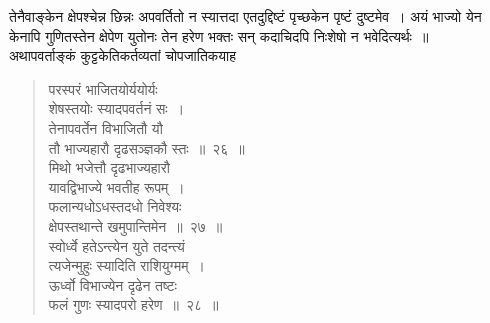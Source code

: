 \documentclass[11pt, openany]{book}
\begin{document}
\newpage%

\noindent तेनैवाङ्केन क्षेपश्चेन्न छिन्नः अपवर्तितो न स्यात्तदा एतदुद्दिष्टं
पृच्छकेन पृष्टं दुष्टमेव~। अयं भाज्यो येन केनापि गुणितस्तेन क्षेपेण युतोनः तेन हरेण
भक्तः सन् कदाचिदपि निःशेषो न भवेदित्यर्थः~॥ \\

\vspace{-3mm}
 अथापवर्ताङ्कं कुट्टकेतिकर्तव्यतां चोपजातिकयाह\textendash 

 \label{26}
\begin{quote}
    \bs
     परस्परं भाजितयोर्ययोर्यः \\

\vspace{-7mm}
\hspace{1cm} शेषस्तयोः स्यादपवर्तनं सः~। \\

\vspace{-7mm}
 तेनापवर्तेन विभाजितौ यौ \\

\vspace{-7mm}
\hspace{1cm} तौ भाज्यहारौ दृढसञ्ज्ञकौ स्तः~॥~२६~॥ \\

 \vspace{-4mm}
 \label{27}
 मिथो भजेत्तौ दृढभाज्यहारौ \\

\vspace{-7mm}
\hspace{1cm} यावद्विभाज्ये भवतीह रूपम्~। \\

\vspace{-7mm}
 फलान्यधोऽधस्तदधो निवेश्यः \\

\vspace{-7mm}
\hspace{1cm} क्षेपस्तथान्ते खमुपान्तिमेन~॥~२७~॥ \\

 \vspace{-4mm}
 \label{28}
 स्वोर्ध्वे हतेऽन्त्येन युते तदन्त्यं \\

\vspace{-7mm}
\hspace{1cm} त्यजेन्मुहुः स्यादिति राशियुग्मम्~। \\

\vspace{-7mm}
 ऊर्ध्वो विभाज्येन दृढेन तष्टः \\

\vspace{-7mm}
\hspace{1cm} फलं गुणः स्यादपरो हरेण~॥~२८~॥ 
\end{quote}
\end{document}
